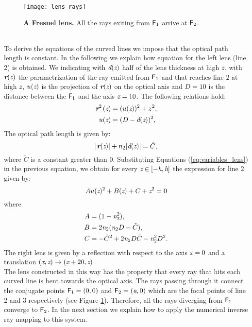 \begin{figure}[t]
  \begin{center}
  \texttt{[image: lens\_rays]}
  \end{center}
  \caption{\textbf{A Fresnel lens.} 
All the rays exiting from $\textsf{F}_1$ arrive at $\textsf{F}_2$.}
\label{fig:real-lens}
 \end{figure}
\\ \indent To derive the equations of the curved lines we impose that the optical path length is constant. In the following we explain how equation for the left lens (line $2$) is obtained. We indicating with $\textit{d}(\textit{z})$ half of the lens thickness at high $\textit{z}$, with $\textit{\textbf{r}}(\textit{z})$ the parametrization of the ray emitted from $\textsf{F}_1$ and that reaches line $2$ at high $\textit{z}$, $u(\textit{z})$ is the projection of $\textit{\textbf{r}}(\textit{z})$ on the optical axis and $D=10$ is the distance between the $\textsf{F}_1$ and the axis $\textit{x}=10$.
The following relations hold:
\begin{equation}\label{eq:variables_lens}
\begin{aligned}
\textit{\textbf{r}}^{2\,}(\textit{z}) &= (u(\textit{z}))^2+\textit{z}^{\,2},\\
u(\textit{z}) &= (D-\textit{d}(\textit{z}))^2, 
\end{aligned}
\end{equation}
The optical path length is given by:
\begin{equation}\label{eq:path_length}
|\textit{\textbf{r}}(\textit{z})|+n_2|\textit{d}(\textit{z})|=\tilde{C},
\end{equation}  
where $\tilde{C}$ is a constant greater than $0$. Substituting Equations (\ref{eq:variables_lens}) in the previous equation,
we obtain for every $\textit{z}\in[-\textit{h}, \textit{h}]$ the expression for line $2$ given by:
\begin{equation}
Au(\textit{z})^2+B(\textit{z})+C+\textit{z}^2 = 0
\end{equation}
where 
\begin{equation}
\begin{aligned}
A & = (1-\textit{n}_2^2), \\
B & = 2\textit{n}_2(\textit{n}_2 D-\tilde{C}), \\
C & = -\tilde{C}^2+2\textit{n}_2 D\tilde{C}-\textit{n}_2^2D^2. \\
\end{aligned}
\end{equation}
The right lens is given by a reflection with respect to the axis $\textit{x}=0$ and a translation $(\textit{x}, \textit{z})\rightarrow (\textit{x}+20, \textit{z})$.
\\ \indent The lens constructed in this way has the property that every ray that hits each curved line is bent towards the optical axis. The rays passing through it connect the conjugate points $\textsf{F}_1 = (0, 0)$ and $\textsf{F}_2= (\textit{a}, 0)$ which are the focal points of line $2$ and $3$ respectively (see Figure \ref{fig:real-lens}). Therefore, all the rays diverging from $\textsf{F}_1$ converge to $\textsf{F}_2$. In the next section we explain how to apply the numerical inverse ray mapping to this system.
